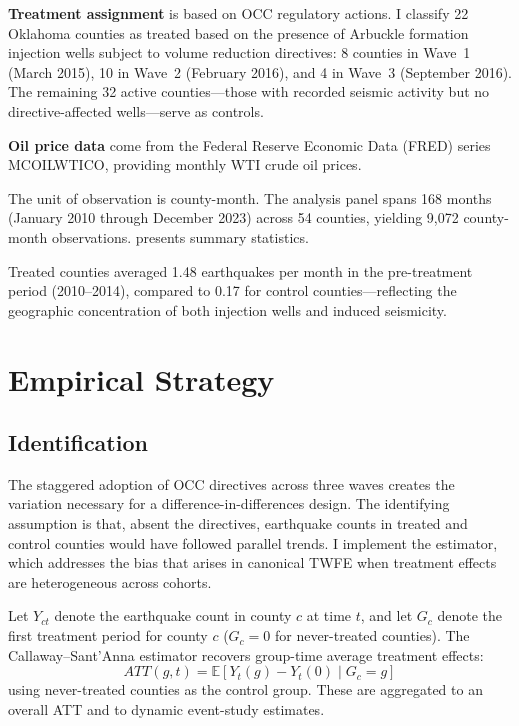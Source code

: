 \documentclass[12pt]{article}
\newcommand{\E}{\mathbb{E}}
\begin{document}
\textbf{Treatment assignment} is based on OCC regulatory actions. I classify 22 Oklahoma counties as treated based on the presence of Arbuckle formation injection wells subject to volume reduction directives: 8 counties in Wave~1 (March 2015), 10 in Wave~2 (February 2016), and 4 in Wave~3 (September 2016). The remaining 32 active counties---those with recorded seismic activity but no directive-affected wells---serve as controls.

\textbf{Oil price data} come from the Federal Reserve Economic Data (FRED) series MCOILWTICO, providing monthly WTI crude oil prices.

The unit of observation is county-month. The analysis panel spans 168 months (January 2010 through December 2023) across 54 counties, yielding 9,072 county-month observations.  presents summary statistics.



Treated counties averaged 1.48 earthquakes per month in the pre-treatment period (2010--2014), compared to 0.17 for control counties---reflecting the geographic concentration of both injection wells and induced seismicity.

\section{Empirical Strategy}

\subsection{Identification}

The staggered adoption of OCC directives across three waves creates the variation necessary for a difference-in-differences design. The identifying assumption is that, absent the directives, earthquake counts in treated and control counties would have followed parallel trends. I implement the \citet{callaway2021difference} estimator, which addresses the bias that arises in canonical TWFE when treatment effects are heterogeneous across cohorts.

Let $Y_{ct}$ denote the earthquake count in county $c$ at time $t$, and let $G_c$ denote the first treatment period for county $c$ ($G_c = 0$ for never-treated counties). The Callaway--Sant'Anna estimator recovers group-time average treatment effects:
\begin{equation}
ATT(g,t) = \E[Y_t(g) - Y_t(0) \mid G_c = g]
\end{equation}
using never-treated counties as the control group. These are aggregated to an overall ATT and to dynamic event-study estimates.
\end{document}
